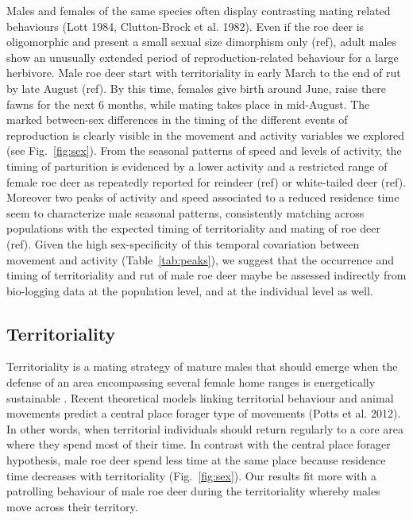 \documentclass[a4paper,11pt]{article}
\begin{document}
Males and females of the same species often display contrasting mating
related behaviours (Lott 1984, Clutton-Brock et al. 1982). Even if the
roe deer is oligomorphic and present a small sexual size dimorphism
only (ref), adult males show an unusually extended period of
reproduction-related behaviour for a large herbivore. Male roe deer
start with territoriality in early March to the end of rut by late
August (ref). By this time, females give birth around June, raise
there fawns for the next 6 months, while mating takes place in
mid-August. The marked between-sex differences in the timing of the
different events of reproduction is clearly visible in the movement
and activity variables we explored (see Fig.~\ref{fig:sex}). From the
seasonal patterns of speed and levels of activity, the timing of
parturition is evidenced by a lower activity and a restricted
range of female roe deer as repeatedly reported for reindeer (ref) or
white-tailed deer (ref). Moreover two peaks of activity and speed
associated to a reduced residence time seem to characterize male
seasonal patterns, consistently matching across populations with the
expected timing of territoriality and mating of roe deer (ref). Given
the high sex-specificity of this temporal covariation between movement
and activity (Table~\ref{tab:peaks}), we suggest that the occurrence
and timing of territoriality and rut of male roe deer maybe be
assessed indirectly from bio-logging data at the population level, and
at the individual level as well.

\subsection*{Territoriality}

Territoriality is a mating strategy of mature males that should emerge
when the defense of an area encompassing several female home ranges is
energetically sustainable \citep{Emlen1977}. Recent theoretical models linking territorial behaviour and animal movements predict a central place forager type of movements
(Potts et al. 2012). In other words, when territorial individuals
should return regularly to a core area where they spend most of their
time. In contrast with the central place forager hypothesis, male roe
deer spend less time at the same place because residence time
decreases with territoriality (Fig.~\ref{fig:sex}). Our results fit more with a patrolling behaviour of male roe deer during the territoriality whereby males move across their territory. 

\end{document}
